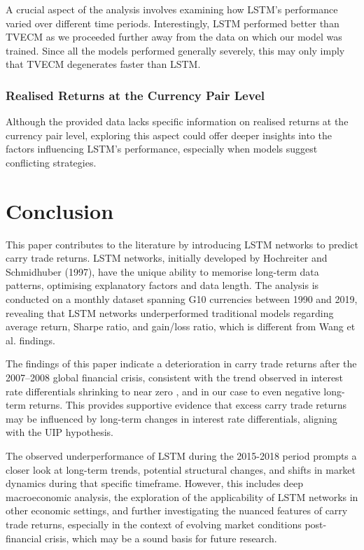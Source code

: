 \documentclass[a4paper,10pt]{article}
\begin{document}
A crucial aspect of the analysis involves examining how LSTM's performance varied over different time periods. Interestingly, LSTM performed better than TVECM as we proceeded further away from the data on which our model was trained. Since all the models performed generally severely, this may only imply that TVECM degenerates faster than LSTM.

\subsubsection{Realised Returns at the Currency Pair Level}

Although the provided data lacks specific information on realised returns at the currency pair level, exploring this aspect could offer deeper insights into the factors influencing LSTM's performance, especially when models suggest conflicting strategies.

\section{Conclusion}

This paper contributes to the literature by introducing LSTM networks to predict carry trade returns. LSTM networks, initially developed by Hochreiter and Schmidhuber (1997), have the unique ability to memorise long-term data patterns, optimising explanatory factors and data length. The analysis is conducted on a monthly dataset spanning G10 currencies between 1990 and 2019, revealing that LSTM networks underperformed traditional models regarding average return, Sharpe ratio, and gain/loss ratio, which is different from Wang et al. findings.

The findings of this paper indicate a deterioration in carry trade returns after the 2007–2008 global financial crisis, consistent with the trend observed in interest rate differentials shrinking to near zero \cite{accominotti2019currency}, and in our case to even negative long-term returns. This provides supportive evidence that excess carry trade returns may be influenced by long-term changes in interest rate differentials, aligning with the UIP hypothesis.

The observed underperformance of LSTM during the 2015-2018 period prompts a closer look at long-term trends, potential structural changes, and shifts in market dynamics during that specific timeframe. However, this includes deep macroeconomic analysis, the exploration of the applicability of LSTM networks in other economic settings, and further investigating the nuanced features of carry trade returns, especially in the context of evolving market conditions post-financial crisis, which may be a sound basis for future research.
\end{document}
